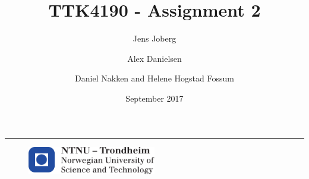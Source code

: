 \documentclass{article}
\title{TTK4190 - Assignment 2}
\author{Jens Joberg \and Alex Danielsen \and Daniel Nakken 
and Helene Hogstad Fossum}
\date{September 2017}
\begin{document}
\begin{titlepage}
    \maketitle
    \rule{\linewidth}{0.5mm}
    \begin{figure}
    \centering
    \includegraphics[width=0.5\textwidth]{utils/logontnu_eng}
    \end{figure}
    \thispagestyle{empty}
\end{titlepage}

\newpage
\setcounter{section}{0}






\end{document}
